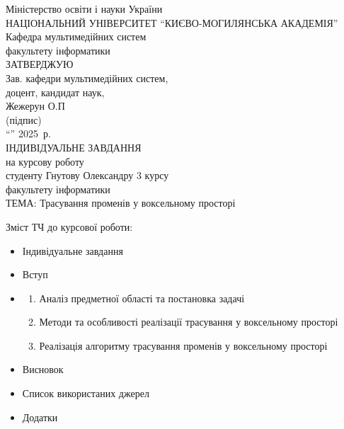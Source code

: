 \begin{center}
    {\large Міністерство освіти і науки України}\\[1em]
    {\large НАЦІОНАЛЬНИЙ УНІВЕРСИТЕТ ``КИЄВО-МОГИЛЯНСЬКА АКАДЕМІЯ''}\\[0em]
    {\large Кафедра мультимедійних систем\\факультету інформатики}\\[2em]

    {\large ЗАТВЕРДЖУЮ}\\
    {\large Зав. кафедри мультимедійних систем,}\\
    {\large доцент, кандидат наук,}\\
    {\large \underline{\hspace{3cm}} Жежерун О.П}\\
    {\mbox{\large (підпис) \hspace{4cm}}}\\
    ``\underline{\hspace{1cm}}'' \underline{\hspace{3cm}} 2025~р.\\[2em]
    
    {\large ІНДИВІДУАЛЬНЕ ЗАВДАННЯ}\\[0.5em]
    {\large на курсову роботу}\\[0.5em]
    студенту Гнутову Олександру 3 курсу\\факультету інформатики\\[0.5em]
    
    ТЕМА: Трасування променів у воксельному просторі\\[1em]
    
    \begin{flushleft}
        Зміст ТЧ до курсової роботи:
        \begin{itemize}[itemsep=0pt, topsep=0pt, label={}, leftmargin=18pt]
            \item Індивідуальне завдання
            \item Вступ
            \item \begin{enumerate}
                \item Аналіз предметної області та постановка задачі
                \item Методи та особливості реалізації трасування у воксельному просторі
                \item Реалізація алгоритму трасування променів у воксельному просторі
            \end{enumerate}
            \item Висновок
            \item Список використаних джерел
            \item Додатки
        \end{itemize}
        \vspace{1em}


\end{flushleft}
\end{center}

